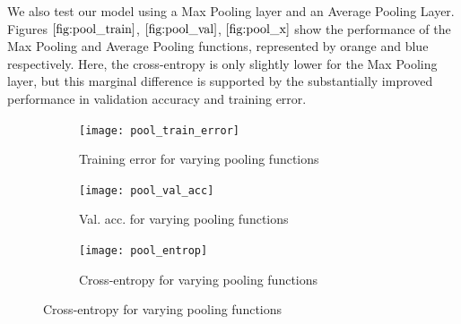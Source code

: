 \documentclass[10pt, twocolumn, twoside]{article}
\begin{document}

We also test our model using a Max Pooling layer and an Average Pooling Layer. Figures $\ref{fig:pool_train}$, $\ref{fig:pool_val}$, $\ref{fig:pool_x}$ show the performance of the Max Pooling and Average Pooling functions, represented by orange and blue respectively. Here, the cross-entropy is only slightly lower for the Max Pooling layer, but this marginal difference is supported by the substantially improved performance in validation accuracy and training error. 

\begin{figure}[h]
    \centering
    \begin{subfigure}
        \centering
        \texttt{[image: pool\_train\_error]}
        \caption{Training error for varying pooling functions}
        \label{fig:pool_train}
    \end{subfigure}
    \vspace{3mm}
    \begin{subfigure}
        \centering
        \texttt{[image: pool\_val\_acc]}
        \caption{Val. acc. for varying pooling functions}
        \label{fig:pool_val}
    \end{subfigure}
    \vspace{3mm}
    \begin{subfigure}
        \centering
        \texttt{[image: pool\_entrop]}
        \caption{Cross-entropy for varying pooling functions}
        \label{fig:pool_x}
    \end{subfigure}
    \label{fig:10}
\end{figure}
\end{document}

